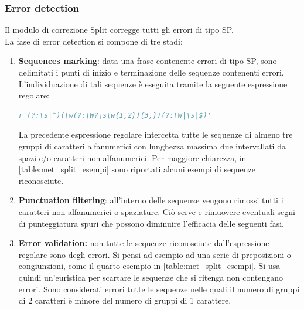 \subsubsection{Error detection}
\label{sec:met_split_errdet}
Il modulo di correzione Split corregge tutti gli errori di tipo SP.\\
La fase di error detection si compone di tre stadi:
\begin{enumerate}
\item \textbf{Sequences marking}: data una frase contenente errori di tipo SP, sono delimitati i punti di inizio e terminazione delle sequenze contenenti errori. L'individuazione di tali sequenze è eseguita tramite la seguente espressione regolare:
\begin{lstlisting}[language=Python]
r'(?:\s|^)(\w(?:\W?\s\w{1,2}){3,})(?:\W|\s|$)'
\end{lstlisting}
La precedente espressione regolare intercetta tutte le sequenze di almeno tre gruppi di caratteri alfanumerici con lunghezza massima due intervallati da spazi e/o caratteri non alfanumerici. Per maggiore chiarezza, in \autoref{table:met_split_esempi} sono riportati alcuni esempi di sequenze riconosciute.

\item \textbf{Punctuation filtering}: all'interno delle sequenze vengono rimossi tutti i caratteri non alfanumerici o spaziature. Ciò serve e rimuovere eventuali segni di punteggiatura spuri che possono diminuire l'efficacia delle seguenti fasi.

\item \textbf{Error validation:} non tutte le sequenze riconosciute dall'espressione regolare sono degli errori. Si pensi ad esempio ad una serie di preposizioni o congiunzioni, come il quarto esempio in \autoref{table:met_split_esempi}. Si usa quindi un'euristica per scartare le sequenze che si ritenga non contengano errori. Sono considerati errori tutte le sequenze nelle quali il numero di gruppi di 2 caratteri è minore del numero di gruppi di 1 carattere.

\end{enumerate}


